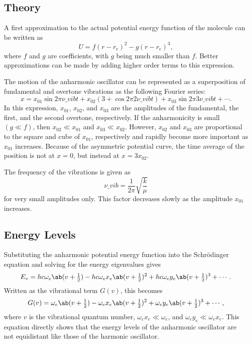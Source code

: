 \subsection{Theory}

A first approximation to the actual potential energy function of the molecule can be written as
\begin{equation*}
    U = f(r - r_e)^2 - g(r - r_e)^3,
\end{equation*}
where $f$ and $g$ are coefficients, with $g$ being much smaller than $f$. Better approximations can be made by adding higher order terms to this expression.

The motion of the anharmonic oscillator can be represented as a superposition of fundamental and overtone vibrations as the following Fourier series:
\begin{equation*}
    x = x_{01}\sin{2\pi\nu\_{vib}t} + x_{02}(3 + \cos{2\pi2\nu\_{vib}t}) + x_{03}\sin{2\pi3\nu\_{vib}t} + \dotsb.
\end{equation*}
In this expression, $x_{01}$, $x_{02}$, and $x_{03}$ are the amplitudes of the fundamental, the first, and the second overtone, respectively. If the anharmonicity is small $(g \ll f)$, then $x_{02} \ll x_{01}$ and $x_{03} \ll x_{02}$. However, $x_{02}$ and $x_{03}$ are proportional to the square and cube of $x_{01}$, respectively and rapidly become more important as $x_{01}$ increases. Because of the asymmetric potential curve, the time average of the position is not at $x = 0$, but instead at $x = 3x_{02}$.

The frequency of the vibrations is given as
\begin{equation*}
    \nu\_{vib} = \frac{1}{2\pi}\sqrt{\frac{k}{\mu}}
\end{equation*}
for very small amplitudes only. This factor decreases slowly as the amplitude $x_{01}$ increases.

\subsection{Energy Levels}

Substituting the anharmonic potential energy function into the Schr\"odinger equation and solving for the energy eigenvalues gives
\begin{equation*}
    E_v = hc\omega_e\ab(v + \tfrac{1}{2}) - hc\omega_ex_e\ab(v + \tfrac{1}{2})^2 + hc\omega_ey_e\ab(v + \tfrac{1}{2})^3 + \dotsb.
\end{equation*}
Written as the vibrational term $G(v)$, this becomes
\begin{equation*}
    G(v) = \omega_e\ab(v + \tfrac{1}{2}) - \omega_ex_e\ab(v + \tfrac{1}{2})^2 + \omega_ey_e\ab(v + \tfrac{1}{2})^3 + \dotsb,
\end{equation*}
where $v$ is the vibrational quantum number, $\omega_ex_e \ll \omega_e$, and $\omega_ey_e \ll \omega_ex_e$. This equation directly shows that the energy levels of the anharmonic oscillator are not equidistant like those of the harmonic oscillator.

